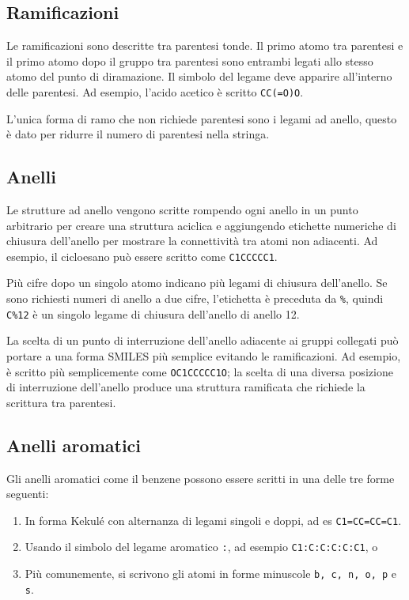 \subsection*{Ramificazioni}
Le ramificazioni sono descritte tra parentesi tonde. Il primo atomo tra parentesi e il primo atomo dopo il gruppo tra parentesi sono entrambi legati allo stesso atomo del punto di diramazione. Il simbolo del legame deve apparire all'interno delle parentesi. Ad esempio, l'acido acetico è scritto \verb|CC(=O)O|.

L'unica forma di ramo che non richiede parentesi sono i legami ad anello, questo è dato per ridurre il numero di parentesi nella stringa.

\subsection*{Anelli}
Le strutture ad anello vengono scritte rompendo ogni anello in un punto arbitrario per creare una struttura aciclica e aggiungendo etichette numeriche di chiusura dell'anello per mostrare la connettività tra atomi non adiacenti.
Ad esempio, il cicloesano può essere scritto come \verb|C1CCCCC1|.

Più cifre dopo un singolo atomo indicano più legami di chiusura dell'anello.  Se sono richiesti numeri di anello a due cifre, l'etichetta è preceduta da \verb|%|, quindi \verb|C%12| è un singolo legame di chiusura dell'anello di anello 12.

La scelta di un punto di interruzione dell'anello adiacente ai gruppi collegati può portare a una forma SMILES più semplice evitando le ramificazioni. Ad esempio,  è scritto più semplicemente come \verb|OC1CCCCC1O|; la scelta di una diversa posizione di interruzione dell'anello produce una struttura ramificata che richiede la scrittura tra parentesi.

\subsection*{Anelli aromatici}
\noindent Gli anelli aromatici come il benzene possono essere scritti in una delle tre forme seguenti:
\begin{enumerate}
	\item In forma Kekulé con alternanza di legami singoli e doppi, ad es \verb|C1=CC=CC=C1|.
	\item Usando il simbolo del legame aromatico \verb|:|, ad esempio \verb|C1:C:C:C:C:C1|, o
	\item \label{it:smilesArom} Più comunemente, si scrivono gli atomi in forme minuscole \verb|b, c, n, o, p| e \verb|s|.
\end{enumerate}

